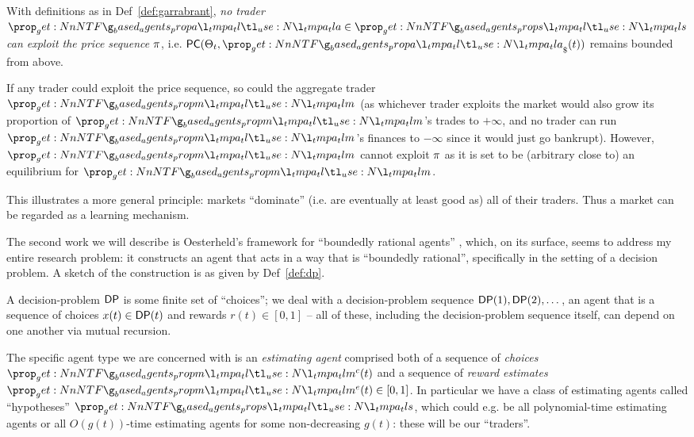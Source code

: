 \documentclass{article}
\begin{document}
\begin{theorem}[Inexploitability]
    With definitions as in Def~\ref{def:garrabrant}, \emph{no trader $\agent\in\agent[s]$ can exploit the price sequence $\pi$}, i.e. $\PC(\thms_t,\inventory(t))$ remains bounded from above. 
    \label{thm:garrabrant}
\end{theorem}

\begin{hproof}
    If any trader could exploit the price sequence, so could the aggregate trader $\agent[m]$ (as whichever trader exploits the market would also grow its proportion of $\agent[m]$'s trades to $+\infty$, and no trader can run $\agent[m]$'s finances to $-\infty$ since it would just go bankrupt). However, $\agent[m]$ cannot exploit $\pi$ as it is set to be (arbitrary close to) an equilibrium for $\agent[m]$.
\end{hproof}

This illustrates a more general principle: markets ``dominate'' (i.e. are eventually at least good as) all of their traders. Thus a market can be regarded as a learning mechanism. 

The second work we will describe is Oesterheld's framework for ``boundedly rational agents'' \cite{oesterheldTheoryBoundedInductive2023}, which, on its surface, seems to address my entire research problem: it constructs an agent that acts in a way that is ``boundedly rational'', specifically in the setting of a decision problem. A sketch of the construction is as given by Def~\ref{def:dp}.

\begin{definition}
    A decision-problem $\mathsf{DP}$ is some finite set of ``choices''; we deal with a decision-problem sequence $\mathsf{DP}(1),\mathsf{DP}(2),\dots$, an agent that is a sequence of choices $x(t)\in\mathsf{DP}(t)$ and rewards $r(t)\in[0,1]$ -- all of these, including the decision-problem sequence itself, can depend on one another via mutual recursion.

    The specific agent type we are concerned with is an \emph{estimating agent} comprised both of a sequence of \emph{choices} $\choice(t)$ and a sequence of \emph{reward estimates} $\estimate(t)\in[0,1]$. In particular we have a class of estimating agents called ``hypotheses'' $\hyps$, which could e.g. be all polynomial-time estimating agents or all $O(g(t))$-time estimating agents for some non-decreasing $g(t)$: these will be our ``traders''.
    \label{def:dp}
\end{definition}
\end{document}
